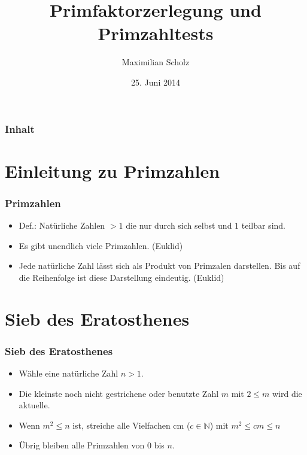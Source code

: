 \documentclass[mathserif, compress, german]{beamer}
\title{Primfaktorzerlegung und Primzahltests}    %
\author{Maximilian Scholz}                 %
\institute{Proseminar Mathematik}      %
\date{25. Juni 2014}                    %
\begin{document}
\begin{frame}
  \titlepage
\end{frame}

\section[]{}

\begin{frame}
  \frametitle{Inhalt}
  \tableofcontents
\end{frame}

\section{Einleitung zu Primzahlen}
  
\begin{frame}
  \frametitle{Primzahlen}
  \begin{itemize}
    \item Def.: Nat\"urliche Zahlen $> 1$ die nur durch sich selbst und $1$ teilbar sind.
      \vspace{3mm}
    \item Es gibt unendlich viele Primzahlen. (Euklid)
      \vspace{3mm}
    \item Jede nat\"urliche Zahl l\"asst sich als Produkt von Primzalen darstellen. 
	  Bis auf die Reihenfolge ist diese Darstellung eindeutig. (Euklid)
  \end{itemize}
\end{frame}

\section{Sieb des Eratosthenes}

\begin{frame}
  \frametitle{Sieb des Eratosthenes}   %

  \begin{itemize}
  \item<2-> W\"ahle eine nat\"urliche Zahl $n> 1$.
  \vspace{3mm}
  \item<3-> Die kleinste noch nicht gestrichene oder benutzte Zahl $m$ mit $2\leq m$ wird die aktuelle.
  \vspace{3mm}
  \item<4-> Wenn $m^2 \leq n$ ist, streiche alle Vielfachen cm ($c \in \mathbb{N}$) mit $m^2 \leq cm \leq n$
  \vspace{3mm}
  \item<5-> \"Ubrig bleiben alle Primzahlen von $0$ bis $n$.
  \end{itemize}
\end{frame}
\end{document}
